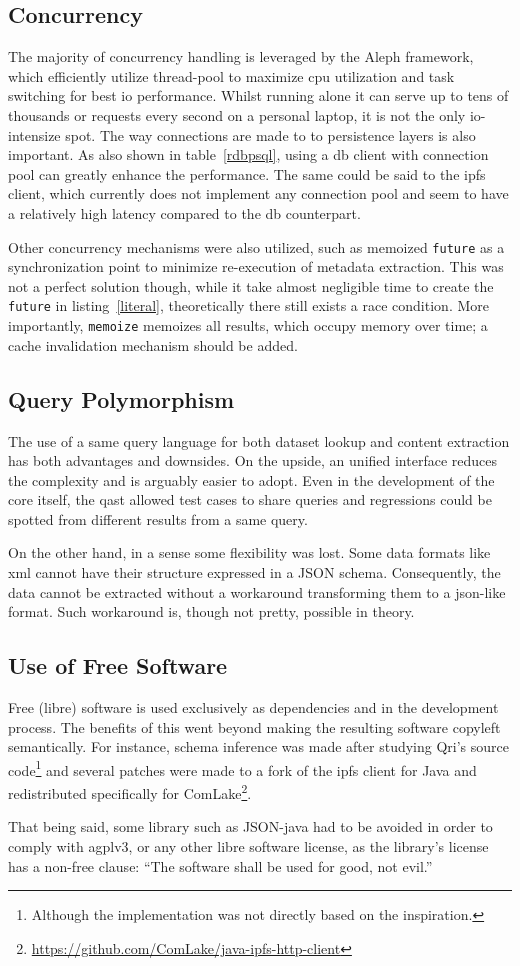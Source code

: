 \subsection{Concurrency}
The majority of concurrency handling is leveraged by the Aleph framework,
which efficiently utilize thread-pool to maximize \gls{cpu} utilization
and task switching for best \gls{io} performance.  Whilst running alone it can
serve up to tens of thousands or requests every second on a personal laptop,
it is not the only \gls{io}-intensize spot.  The way connections are made to
to persistence layers is also important.  As also shown in table~\ref{rdbpsql},
using a \gls{db} client with connection pool can greatly enhance
the performance.  The same could be said to the \gls{ipfs} client,
which currently does not implement any connection pool and seem to have
a relatively high latency compared to the \gls{db} counterpart.

Other concurrency mechanisms were also utilized, such as memoized \verb|future|
as a synchronization point to minimize re-execution of metadata extraction.
This was not a perfect solution though, while it take almost negligible time
to create the \verb|future| in listing~\ref{literal}, theoretically there still
exists a race condition.  More importantly, \verb|memoize| memoizes all results,
which occupy memory over time; a cache invalidation mechanism should be added.

\subsection{Query Polymorphism}
The use of a same query language for both dataset lookup and content extraction
has both advantages and downsides.  On the upside, an unified interface
reduces the complexity and is arguably easier to adopt.  Even in the development
of the core itself, the \gls{qast} allowed test cases to share queries
and regressions could be spotted from different results from a same query.

On the other hand, in a sense some flexibility was lost.  Some data formats
like \gls{xml} cannot have their structure expressed in a JSON schema.
Consequently, the data cannot be extracted without a workaround transforming
them to a \gls{json}-like format.  Such workaround is, though not pretty,
possible in theory.

\subsection{Use of Free Software}
Free (libre) software is used exclusively as dependencies and in the development
process.  The benefits of this went beyond making the resulting software
copyleft semantically.  For instance, schema inference was made after
studying Qri's source code\footnote{Although the implementation was not
directly based on the inspiration.} and several patches were made to a fork
of the \gls{ipfs} client for Java and redistributed specifically for
ComLake\footnote{\url{https://github.com/ComLake/java-ipfs-http-client}}.

That being said, some library such as JSON-java had to be avoided in order
to comply with \gls{agplv3}, or any other libre software license, as the
library's license has a non-free clause: ``The software shall be used for good,
not evil.''
